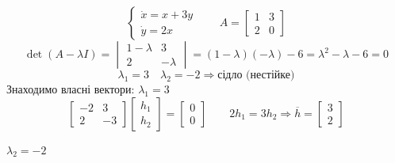 \begin{example}
    $$
    \begin{cases}
        \dot{x} = x + 3y\\
        \dot{y} = 2x
    \end{cases} \qquad A = \begin{bmatrix}
     1 & 3 \\
     2 & 0
    \end{bmatrix}
    $$
    $$
    \det (A - \lambda I) = \begin{vmatrix}
      1-\lambda & 3 \\
      2 & - \lambda
    \end{vmatrix} = (1- \lambda)(-\lambda) - 6 = \lambda^2 - \lambda - 6 = 0
    $$
    $$
    \lambda_1 = 3 \quad \lambda_2 = -2 \Longrightarrow \text{сідло (нестійке)}
    $$
    Знаходимо власні вектори:
    $\lambda_1 = 3$
    $$
    \begin{bmatrix}
     -2 & 3\\
     2 & -3
    \end{bmatrix} \begin{bmatrix}
     h_1\\
     h_2
    \end{bmatrix} = \begin{bmatrix}
      0\\
      0
    \end{bmatrix} \qquad 2h_1 = 3 h_2 \Rightarrow \overline{h} = \begin{bmatrix}
     3 \\
     2
    \end{bmatrix}
    $$

    $\lambda_2 = -2$


\end{example}
